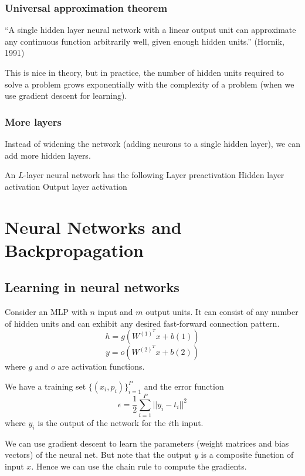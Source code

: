 \documentclass[a4paper,12pt]{article}
\begin{document}
\subsubsection{Universal approximation theorem}

``A single hidden layer neural network with a linear output unit can approximate any continuous function arbitrarily well, given enough hidden units.'' (Hornik, 1991)

This is nice in theory, but in practice, the number of hidden units required to solve a problem grows exponentially with the complexity of a problem (when we use gradient descent for learning). 

\subsubsection{More layers}

Instead of widening the network (adding neurons to a single hidden layer), we can add more hidden layers. 

An $L$-layer neural network has the following
Layer preactivation
Hidden layer activation
Output layer activation



\clearpage

\section{Neural Networks and Backpropagation}

\subsection{Learning in neural networks}

Consider an MLP with $n$ input and $m$ output units. It can consist of any number of hidden units and can exhibit any desired fast-forward connection pattern. 
$$h = g(W^{(1)^T}x + b{(1)})$$
$$y = o(W^{(2)^T}x + b{(2)})$$
where $g$ and $o$ are activation functions. 

We have a training set $\{(x_i, p_i)\}_{i=1}^P$ and the error function
$$\epsilon = \frac{1}{2} \sum_{i=1}^P ||y_i - t_i||^2$$
where $y_i$ is the output of the network for the $i$th input. 

We can use gradient descent to learn the parameters (weight matrices and bias vectors) of the neural net. But note that the output $y$ is a composite function of input $x$. Hence we can use the chain rule to compute the gradients. 
\end{document}
